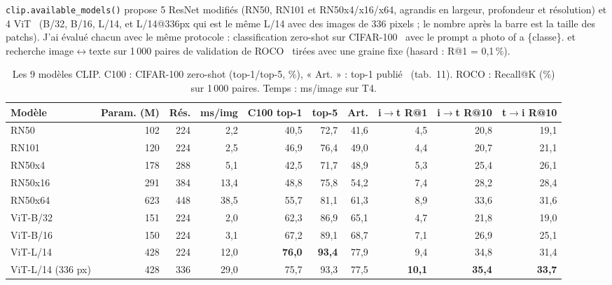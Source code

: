 \documentclass[12pt,a4paper]{article}
\newcommand{\sect}[1]{\vspace{4pt}{\large\bfseries #1}\par\vspace{1pt}}
\begin{document}
\sect{3. Comparaison des 9 modèles CLIP (consigne 2)}
\texttt{clip.available\_models()} propose 5 ResNet modifiés (RN50, RN101 et RN50x4/x16/x64, agrandis en largeur, profondeur et résolution) et 4 ViT~\cite{vit} (B/32, B/16, L/14, et L/14@336px qui est le même L/14 avec des images de 336 pixels ; le nombre après la barre est la taille des patchs). J'ai évalué chacun avec le même protocole : classification zero-shot sur CIFAR-100~\cite{cifar} avec le prompt \og a photo of a \{classe\}.\fg{} et recherche image$\leftrightarrow$texte sur 1\,000 paires de validation de ROCO~\cite{roco} tirées avec une graine fixe (hasard : R@1 = 0,1\,\%).

\begin{table}[h]
\centering\footnotesize
\caption{Les 9 modèles CLIP. C100 : CIFAR-100 zero-shot (top-1/top-5, \%), « Art. » : top-1 publié~\cite{radford} (tab.~11). ROCO : Recall@K (\%) sur 1\,000 paires. Temps : ms/image sur T4.}
\label{tab:modeles}
\begin{tabular}{lrrrrrrrrr}
\toprule
Modèle & Param. (M) & Rés. & ms/img & C100 top-1 & top-5 & Art. & i$\to$t R@1 & i$\to$t R@10 & t$\to$i R@10\\
\midrule
RN50 & 102 & 224 & 2,2 & 40,5 & 72,7 & 41,6 & 4,5 & 20,8 & 19,1\\
RN101 & 120 & 224 & 2,5 & 46,9 & 76,4 & 49,0 & 4,4 & 20,7 & 21,1\\
RN50x4 & 178 & 288 & 5,1 & 42,5 & 71,7 & 48,9 & 5,3 & 25,4 & 26,1\\
RN50x16 & 291 & 384 & 13,4 & 48,8 & 75,8 & 54,2 & 7,4 & 28,2 & 28,4\\
RN50x64 & 623 & 448 & 38,5 & 55,7 & 81,1 & 61,3 & 8,9 & 33,6 & 31,6\\
ViT-B/32 & 151 & 224 & 2,0 & 62,3 & 86,9 & 65,1 & 4,7 & 21,8 & 19,0\\
ViT-B/16 & 150 & 224 & 3,1 & 67,2 & 89,1 & 68,7 & 7,1 & 26,9 & 25,1\\
ViT-L/14 & 428 & 224 & 12,0 & \textbf{76,0} & \textbf{93,4} & 77,9 & 9,4 & 34,8 & 31,4\\
ViT-L/14 (336 px) & 428 & 336 & 29,0 & 75,7 & 93,3 & 77,5 & \textbf{10,1} & \textbf{35,4} & \textbf{33,7}\\
\bottomrule
\end{tabular}
\end{table}
\end{document}
